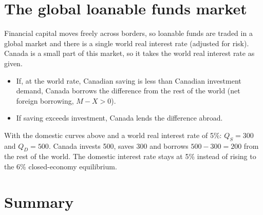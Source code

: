 \section{The global loanable funds market}

Financial capital moves freely across borders, so loanable funds are traded in a global
market and there is a single world real interest rate (adjusted for risk). Canada is a
small part of this market, so it takes the world real interest rate as given.
\begin{itemize}
  \item If, at the world rate, Canadian saving is less than Canadian investment demand,
        Canada borrows the difference from the rest of the world (net foreign borrowing,
        $M - X > 0$).
  \item If saving exceeds investment, Canada lends the difference abroad.
\end{itemize}

\begin{example}
With the domestic curves above and a world real interest rate of 5\%: $Q_S = 300$ and
$Q_D = 500$. Canada invests 500, saves 300 and borrows $500 - 300 = 200$ from the rest
of the world. The domestic interest rate stays at 5\% instead of rising to the 6\%
closed-economy equilibrium.
\end{example}

\begin{center}
\end{center}

\section{Summary}

